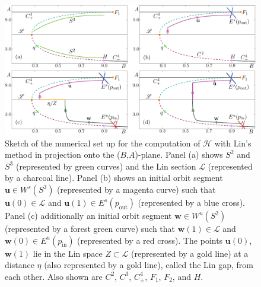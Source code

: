\documentclass{ws-ijbc}
\begin{document}
\begin{figure}[h]
\centering
\includegraphics[]{./figures/MKMO_8.pdf}
\caption{Sketch of the numerical set up for the computation of $\mathscr{H}$ with Lin's method in projection onto the ($B$,$A$)-plane.  Panel (a) shows $S^2$ and $S^3$ (represented by green curves) and the Lin section $\mathscr{L}$ (represented by a charcoal line).  Panel (b) shows an initial orbit segment $\mathbf{u} \in W^s(S^3)$ (represented by a magenta curve) such that $\mathbf{u}(0) \in \mathscr{L}$ and $\mathbf{u}(1) \in E^s(p_{\text{out}})$ (represented by a blue cross).  Panel (c) additionally an initial orbit segment $\mathbf{w} \in W^u(S^2)$ (represented by a forest green curve) such that $\mathbf{w}(1) \in \mathscr{L}$ and $\mathbf{w}(0) \in E^u(p_{\text{in}})$ (represented by a red cross).  The points $\mathbf{u}(0)$, $\mathbf{w}(1)$ lie in the Lin space $Z \subset \mathscr{L}$ (represented by a gold line) at a distance $\eta$ (also represented by a gold line), called the Lin gap, from each other.  Also shown are $C^2$, $C^3$, $C^4_\pm$, $F_1$, $F_2$, and $H$.}
\label{figure_8}
\end{figure}
\end{document}

